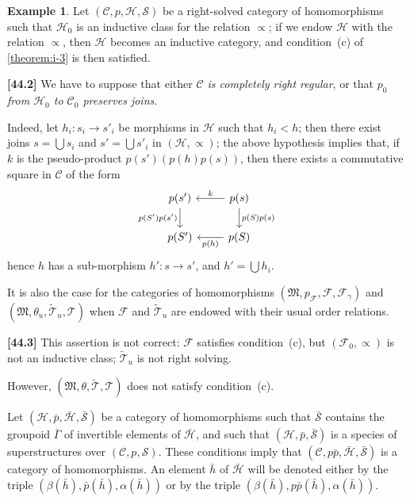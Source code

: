\documentclass[a4paper,fleqn]{article}
\theoremstyle{plain}
\theoremstyle{definition}
\newtheorem*{example}{Example}
\newenvironment{longcomm}[1]
  {\noindent\textbf{[#1]}\rmfamily}
  {}
\newcommand{\oldpage}[1]{{\marginpar{\footnotesize$\bigg\vert$\,\,\,\,\textit{p.~#1}}}}
\newcommand{\CC}{\mathcal{C}}
\newcommand{\HH}{\mathcal{H}}
\newcommand{\bHH}{\bar{\HH}}
\renewcommand{\SS}{\mathcal{S}}
\newcommand{\bSS}{\bar{\SS}}
\newcommand{\MM}{\mathfrak{M}}
\newcommand{\FF}{\mathcal{F}}
\newcommand{\TT}{\mathcal{T}}
\newcommand{\tTT}{\widetilde{\TT}}
\newcommand{\subs}{\mathrel{\propto}}
\begin{document}
\begin{example}
  Let $(\CC,p,\HH,\SS)$ be a right-solved category of homomorphisms such that $\HH_0$ is an inductive class \cite{3a} for the relation $\subs$;
  if we endow $\HH$ with the relation $\subs$, then $\HH$ becomes an inductive category, and condition~(c) of \cref{theorem:i-3} is then satisfied.

  \begin{longcomm}{44.2}
    We have to suppose that either \emph{$\CC$ is completely right regular}, or that \emph{$p_0$ from $\HH_0$ to $\CC_0$ preserves joins}.

    Indeed, let $h_i\colon s_i\to s'_i$ be morphisms in $\HH$ such that $h_i<h$;
    then there exist joins $s=\bigcup s_i$ and $s'=\bigcup s'_i$ in $(\HH,\subs)$;
    the above hypothesis implies that, if $k$ is the pseudo-product $p(s')(p(h)p(s))$, then there exists a commutative square in $\CC$ of the form
    \[
      \begin{tikzcd}
        p(s')
          \ar[d,swap,"p(S')p(s')"]
        & p(s)
          \ar[l,swap,"k"]
          \ar[d,"p(S)p(s)"]
      \\p(S')
        & p(S)
          \ar[l,"p(h)"]
      \end{tikzcd}
    \]
    hence $h$ has a sub-morphism $h'\colon s\to s'$, and $h'=\bigcup h_i$.
  \end{longcomm}

  It is also the case for the categories of homomorphisms $(\MM,p_\FF,\FF,\FF_\gamma)$ and $(\MM,\theta_u,\tTT_u,\TT)$ when $\FF$ and $\tTT_u$ are endowed with their usual order relations.

  \begin{longcomm}{44.3}
    This assertion is not correct: $\FF$ satisfies condition~(c), but $(\FF_0,\subs)$ is not an inductive class; $\tTT_u$ is not right solving.
  \end{longcomm}

  However, $(\MM,\theta,\tTT,\TT)$ does not satisfy condition~(c).
\end{example}

Let $(\HH,\bar{p},\bHH,\bSS)$ be a category of homomorphisms such that $\bSS$ contains the groupoid $\bar{\Gamma}$ of invertible elements of $\bHH$, and such that $(\HH,\bar{p},\bSS)$ is a species of superstructures \cite{3a} over $(\CC,p,\SS)$.
\oldpage{373}
These conditions imply that $(\CC,p\bar{p},\bHH,\bSS)$ is a category of homomorphisms.
An element $\bar{h}$ of $\bHH$ will be denoted either by the triple $(\beta(\bar{h}),\bar{p}(\bar{h}),\alpha(\bar{h}))$ or by the triple $(\beta(\bar{h}),p\bar{p}(\bar{h}),\alpha(\bar{h}))$.
\end{document}
